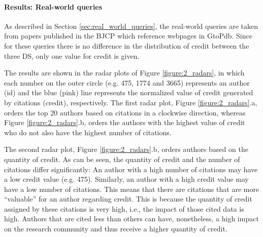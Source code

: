 \paragraph{Results: Real-world queries}
As described in Section \ref{sec:real_world_queries}, the real-world queries are taken from papers published in the BJCP which reference webpages in GtoPdb.
Since for these queries there is no difference in the distribution of credit between the three DS, only one value for credit is given.

The results are shown in the radar plots of Figure \ref{figure:2_radars}, in which each number on the outer circle (e.g. 475, 1774 and 3665) represents an author (id) and the blue (pink) line represents the normalized value of credit generated by citations (credit), respectively. The first radar plot,
Figure \ref{figure:2_radars}.a, orders the top 20 authors based on citations in a clockwise direction, whereas Figure \ref{figure:2_radars}.b, orders the authors with the highest value of credit who do not also have the highest number of citations. 


The second radar plot, Figure \ref{figure:2_radars}.b, orders authors based on the quantity of credit. 
As can be seen, the quantity of credit and the number of citations differ significantly:  An author with a high number of citations may have a low credit value (e.g. 475). Similarly, an author with a high credit value may have a low number of citations.   
This means that there are citations that are more ``valuable'' for an author regarding credit. This is because the quantity of credit assigned by these citations is very high, i.e., the impact of those cited data is high. Authors that are cited less than others can have, nonetheless, a high impact on the research community and thus receive a higher quantity of credit.



